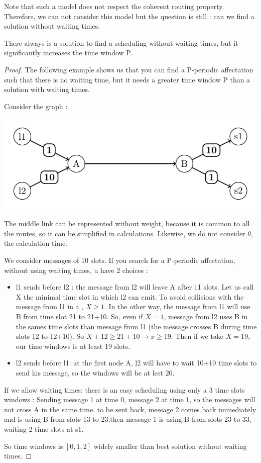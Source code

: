 \documentclass{article}
\begin{document}
Note that such a model does not respect the coherent routing property. Therefore, we can not consider this model but the question is still : can we
find a solution without waiting times.

\begin{lemma}
 There always is a solution to find a scheduling without waiting times, but it significantly increases the time window P. 
\end{lemma}

\begin{proof}
 
The following example shows us that you can find a P-periodic affectation such that there is no waiting time, but it needs a greater time window P than a
solution with waiting times.

Consider the graph : 
\begin{center}
 
\includegraphics[scale=0.7]{Fig10.pdf}
\end{center}

The middle link can be represented without weight, because it is common to all the routes, so it can be simplified in calculations. 
Likewise, we do not consider $\theta$, the calculation time.

We consider messages of 10 slots. If you search for a P-periodic affectation, without using waiting times, u have 2 choices : 
\begin{itemize}
 \item l1 sends before l2 : the message from l2 will leave A after 11 slots. Let us call X the minimal time slot in which l2 can emit. 
 To avoid collisions with the message from l1 in a , $X\ge1$.
 In the other way, the message from l1 will use B from time slot 21 to 21+10. So, even if $X = 1$, message from l2 uses B in the sames time slots
 than message from l1 (the message crosses B during time slots 12 to 12+10). So $X+12 \ge 21+10 \rightarrow x\ge 19$. Then if we take $X=19$, our time
 windows is at least 19 slots.
 \item l2 sends before l1: at the first node A, l2 will have to wait 10+10 time slots to send his message, so the windows will be at lest 20.
\end{itemize}

If we allow waiting times: there is an easy scheduling using only a 3 time slots windows : 
Sending message 1 at time 0, message 2 at time 1, so the messages will not cross A in the same time. to be sent back,
message 2 comes back immediately and is using B from slots 13 to 23,then message 1 is using B from slots 23 to 33, waiting 2 time slots at s1.

So time windows is $[0,1,2]$ widely smaller than best solution without waiting times.

\end{proof}
\end{document}

